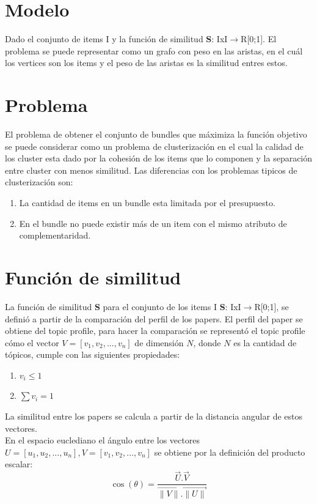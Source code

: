 \section{Modelo}
Dado el conjunto de items I y la función de similitud \textbf{S}: IxI$\rightarrow$R[0;1]. El problema se puede representar como un grafo 
con peso en las aristas, en el cuál los vertices son los items y el peso de las aristas es la similitud entres estos.
\section{Problema}
El problema de obtener el conjunto de bundles que máximiza la función objetivo se puede considerar como un problema
de clusterización en el cual la calidad de los cluster esta dado por la cohesión de los items que lo componen y la
separación entre cluster con menos similitud.
Las diferencias con los problemas tipicos de clusterización son:
\begin{enumerate}
 \item La cantidad de items en un bundle esta limitada por el presupuesto.
 \item En el bundle no puede existir más de un item con el mismo atributo de complementaridad.
\end{enumerate}
\section{Función de similitud}
La función de similitud \textbf{S} para el conjunto de los items I \textbf{S}: IxI$\rightarrow$R[0;1],
se definió a partir de la comparación del perfil de los papers. El perfil del paper se obtiene del topic profile, 
para hacer la comparación se representó el topic profile cómo el vector $V = [v_1,v_2,...,v_n]$  de dimensión $N$, donde $N$ es la cantidad de tópicos,
cumple con las siguientes propiedades:
\begin{enumerate}
 \item $v_i \leqslant 1$
 \item $\sum{v_i} = 1$
\end{enumerate}

La similitud entre los papers se calcula a partir de la distancia angular de estos vectores.\\

En el espacio euclediano el ángulo entre los vectores $U = [u_1,u_2,...,u_n], V = [v_1,v_2,...,v_n]$ se obtiene por la definición del producto escalar:\\
\begin{equation} \label{eq:angulovectorial}
\cos(\theta) =  \dfrac{\overrightarrow{U} . \overrightarrow{V}}{\overrightarrow{\lVert V\lVert}.\overrightarrow{\lVert U\lVert}}
\end{equation}

